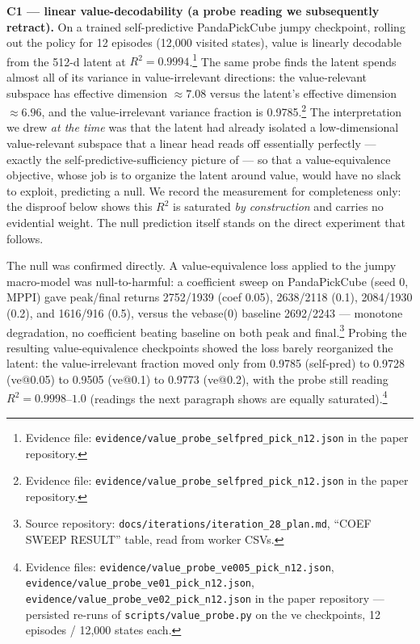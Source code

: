 \documentclass{article}
\begin{document}
\textbf{C1 --- linear value-decodability (a probe reading we subsequently retract).} On a trained self-predictive PandaPickCube jumpy checkpoint, rolling out the policy for 12 episodes (12{,}000 visited states), value is linearly decodable from the 512-d latent at $R^2=0.9994$.\footnote{Evidence file: \texttt{evidence/value\_probe\_selfpred\_pick\_n12.json} in the paper repository.} The same probe finds the latent spends almost all of its variance in value-irrelevant directions: the value-relevant subspace has effective dimension $\approx 7.08$ versus the latent's effective dimension $\approx 6.96$, and the value-irrelevant variance fraction is 0.9785.\footnote{Evidence file: \texttt{evidence/value\_probe\_selfpred\_pick\_n12.json} in the paper repository.} The interpretation we drew \emph{at the time} was that the latent had already isolated a low-dimensional value-relevant subspace that a linear head reads off essentially perfectly --- exactly the self-predictive-sufficiency picture of \citet{ni2024bridging} --- so that a value-equivalence objective, whose job is to organize the latent around value, would have no slack to exploit, predicting a null. We record the measurement for completeness only: the disproof below shows this $R^2$ is saturated \emph{by construction} and carries no evidential weight. The null prediction itself stands on the direct experiment that follows.

The null was confirmed directly. A value-equivalence loss applied to the jumpy macro-model was null-to-harmful: a coefficient sweep on PandaPickCube (seed 0, MPPI) gave peak/final returns 2752/1939 (coef 0.05), 2638/2118 (0.1), 2084/1930 (0.2), and 1616/916 (0.5), versus the vebase(0) baseline 2692/2243 --- monotone degradation, no coefficient beating baseline on both peak and final.\footnote{Source repository: \texttt{docs/iterations/iteration\_28\_plan.md}, ``COEF SWEEP RESULT'' table, read from worker CSVs.} Probing the resulting value-equivalence checkpoints showed the loss barely reorganized the latent: the value-irrelevant fraction moved only from 0.9785 (self-pred) to 0.9728 (ve@0.05) to 0.9505 (ve@0.1) to 0.9773 (ve@0.2), with the probe still reading $R^2=0.9998$--$1.0$ (readings the next paragraph shows are equally saturated).\footnote{Evidence files: \texttt{evidence/value\_probe\_ve005\_pick\_n12.json}, \texttt{evidence/value\_probe\_ve01\_pick\_n12.json}, \texttt{evidence/value\_probe\_ve02\_pick\_n12.json} in the paper repository --- persisted re-runs of \texttt{scripts/value\_probe.py} on the ve checkpoints, 12 episodes / 12{,}000 states each.}
\end{document}
